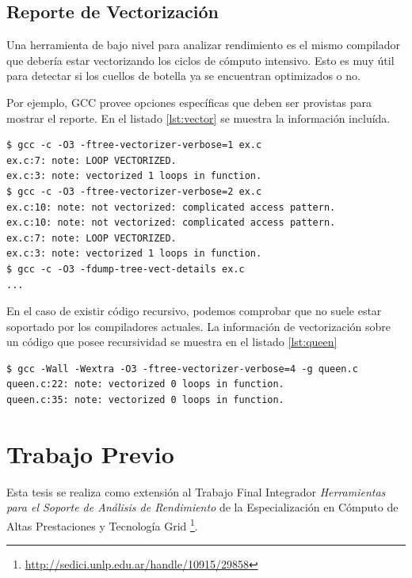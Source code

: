 \documentclass[a4paper]{report}
\begin{document}
\subsection{Reporte de Vectorización}

Una herramienta de bajo nivel para analizar rendimiento es el mismo compilador que debería estar vectorizando los ciclos de cómputo intensivo. Esto es muy
útil para detectar si los cuellos de botella ya se encuentran optimizados o no.

\bigskip

Por ejemplo, GCC provee opciones específicas que deben ser provistas para mostrar el reporte.
En el listado \ref{lst:vector} se muestra la información incluída.

\begin{lstlisting}[caption={Información de Vectorización},label={lst:vector}] 
$ gcc -c -O3 -ftree-vectorizer-verbose=1 ex.c
ex.c:7: note: LOOP VECTORIZED.
ex.c:3: note: vectorized 1 loops in function.
$ gcc -c -O3 -ftree-vectorizer-verbose=2 ex.c
ex.c:10: note: not vectorized: complicated access pattern.
ex.c:10: note: not vectorized: complicated access pattern.
ex.c:7: note: LOOP VECTORIZED.
ex.c:3: note: vectorized 1 loops in function.
$ gcc -c -O3 -fdump-tree-vect-details ex.c
...
\end{lstlisting}

En el caso de existir código recursivo, podemos comprobar que no suele estar soportado por los compiladores actuales.
La información de vectorización sobre un código que posee recursividad se muestra en el listado \ref{lst:queen}

\begin{lstlisting}[caption={Vectorización de Código Recursivo},label={lst:queen}]
$ gcc -Wall -Wextra -O3 -ftree-vectorizer-verbose=4 -g queen.c
queen.c:22: note: vectorized 0 loops in function.
queen.c:35: note: vectorized 0 loops in function.
\end{lstlisting}

\section{Trabajo Previo}

Esta tesis se realiza como extensión al Trabajo Final Integrador {\it Herramientas para el Soporte de Análisis de Rendimiento} de la Especialización en Cómputo de Altas Prestaciones y Tecnología Grid \footnote{\href{http://sedici.unlp.edu.ar/handle/10915/29858}{http://sedici.unlp.edu.ar/handle/10915/29858}}.
\end{document}
